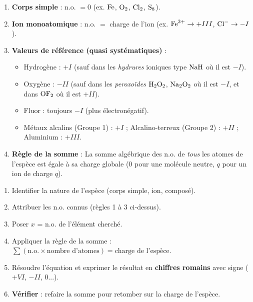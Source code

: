 \documentclass[11pt]{article}
\newcommand{\cle}[1]{{\popxbold\color{popdark}#1}}
\begin{document}
\begin{aretenir}
\begin{enumerate}
\item \textbf{Corps simple} : n.o. $= 0$ (ex. $\ce{Fe}$, $\ce{O2}$, $\ce{Cl2}$, $\ce{S8}$).
\item \textbf{Ion monoatomique} : n.o. $=$ charge de l'ion (ex. $\ce{Fe^3+} \to +III$, $\ce{Cl-} \to -I$).
\item \textbf{Valeurs de référence (quasi systématiques)} :
      \begin{itemize}
      \item Hydrogène : $+I$ (sauf dans les \emph{hydrures} ioniques type $\ce{NaH}$ où il est $-I$).
      \item Oxygène : $-II$ (sauf dans les \emph{peroxoïdes} $\ce{H2O2}$, $\ce{Na2O2}$ où il est $-I$, et dans $\ce{OF2}$ où il est $+II$).
      \item Fluor : toujours $-I$ (plus électronégatif).
      \item Métaux alcalins (Groupe 1) : $+I$ ; Alcalino-terreux (Groupe 2) : $+II$ ; Aluminium : $+III$.
      \end{itemize}
\item \textbf{Règle de la somme} : La somme algébrique des n.o. de \emph{tous} les atomes de l'espèce est égale à sa \cle{charge globale} ($0$ pour une molécule neutre, $q$ pour un ion de charge $q$).
\end{enumerate}
\end{aretenir}

\begin{methode}
\begin{enumerate}
\item Identifier la nature de l'espèce (corps simple, ion, composé).
\item Attribuer les n.o. connus (règles 1 à 3 ci-dessus).
\item Poser $x$ = n.o. de l'élément cherché.
\item Appliquer la règle de la somme : $\sum (\text{n.o.} \times \text{nombre d'atomes}) = \text{charge de l'espèce}$.
\item Résoudre l'équation et exprimer le résultat en \textbf{chiffres romains} avec signe ($+VI$, $-II$, $0$...).
\item \textbf{Vérifier} : refaire la somme pour retomber sur la charge de l'espèce.
\end{enumerate}
\end{methode}
\end{document}
